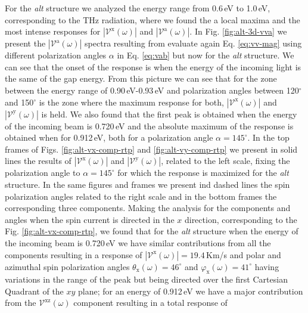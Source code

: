 \documentclass[prb,11pt,tightenlines,twocolumn,aps]{revtex4-1}
\begin{document}
For the \emph{alt} structure we analyzed the energy range from 0.6\,eV to
1.0\,eV, corresponding to the THz radiation, where we found the a local maxima
and the most intense responses for $|\mathcal{V}^{\mathrm{x}}(\omega)|$ and
$|\mathcal{V}^{\mathrm{a}}(\omega)|$. In Fig. \ref{fig:alt-3d-vva} we present
the $|\mathcal{V}^{\mathrm{a}}(\omega)|$ spectra resulting from evaluate again
Eq. \eqref{eq:vv-mag} using different polarization angles $\alpha$ in Eq.
\eqref{eq:vab} but now for the \emph{alt} structure. We can see that the onset
of the response is when the energy of the incoming light is the same of the gap
energy.
%
From this picture we can see that for the zone between the energy range of
0.90\,eV-0.93\,eV and polarization angles between 120$^{\circ}$ and
150$^{\circ}$ is the zone where the maximum response for both,
$|\mathcal{V}^{\mathrm{x}}(\omega)|$ and $|\mathcal{V}^{\mathrm{y}}(\omega)|$ is
held. We also found that the first peak is obtained when the energy of the
incoming beam is 0.720\,eV and  the absolute maximum of the response is obtained
when for 0.912\,eV, both for a polarization angle $\alpha = 145^{\circ}$.
In the top frames of Figs. \ref{fig:alt-vx-comp-rtp}  and 
%
\ref{fig:alt-vy-comp-rtp} we present in solid lines the results of
$|\mathcal{V}^{\mathrm{x}}(\omega)|$ and $|\mathcal{V}^{\mathrm{y}}(\omega)|$,
related to the left scale, fixing the polarization angle to $\alpha=145^{\circ}$
for which the response is maximized for the \emph{alt} structure. In the same
figures and frames we present ind dashed lines the spin polarization angles
related to the right scale and in the bottom frames the corresponding three
components.
% 
Making the analysis for the components and angles when the spin current is
directed in the $x$ direction, corresponding to the Fig. 
% 
\ref{fig:alt-vx-comp-rtp}, we found that for the \emph{alt} structure when the
energy of the incoming beam is 0.720\,eV we have similar contributions from all
the components resulting in a response of
$|\mathcal{V}^{\mathrm{x}}(\omega)|=19.4$\,Km/s and polar and azimuthal spin
polarization angles $\theta_{\mathrm{x}}(\omega)=46^{\circ}$ and
$\varphi_{\mathrm{x}}(\omega)=41^{\circ}$ having variations in the range of the
peak but being directed over the first Cartesian Quadrant of the $xy$ plane;
% 
for an energy of 0.912\,eV we have a major contribution from the
$\mathcal{V}^{\mathrm{xz}}(\omega)$ component resulting in a total response of
\end{document}
